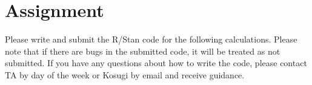 \documentclass{ltjsbook}
\begin{document}
\section{Assignment}
Please write and submit the R/Stan code for the following calculations. Please note that if there are bugs in the submitted code, it will be treated as not submitted. If you have any questions about how to write the code, please contact TA by day of the week or Kosugi by email and receive guidance.

\end{document}
